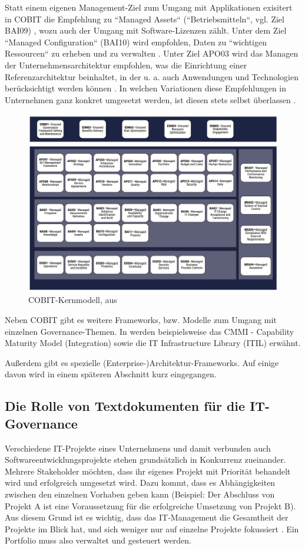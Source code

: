 Statt einem eigenen Management-Ziel zum Umgang mit Applikationen exisitert in COBIT die Empfehlung zu ``Managed Assets`` (``Betriebsmitteln``, vgl. Ziel BAI09) \cite[S. 209-214]{isaca1}, wozu auch der Umgang mit Software-Lizenzen zählt. Unter dem Ziel ``Managed Configuration`` (BAI10) wird empfohlen, Daten zu ``wichtigen Ressourcen`` zu erheben und zu verwalten \cite[S. 73]{gaulke}. Unter Ziel APO03 wird das Managen der Unternehmensarchitektur empfohlen, was die Einrichtung einer Referenzarchitektur beinhaltet, in der u. a. auch Anwendungen und Technologien berücksichtigt werden können \cite[S. 70]{gaulke}. In welchen Variationen diese Empfehlungen in Unternehmen ganz konkret umgesetzt werden, ist diesen stets selbst überlassen \cite[S. 65]{gaulke}.
 
\begin{figure}[h]
\centering
\includegraphics[scale=0.9]{content/pics/Picture_7.png}
\caption{COBIT-Kernmodell, aus \cite[S. 21]{isaca2}}
\label{Abbildung:isaca}
\end{figure}

Neben COBIT gibt es weitere Frameworks, bzw. Modelle zum Umgang mit einzelnen Governance-Themen. In \cite[S. 127-133]{gaulke} werden beispielsweise das CMMI - Capability Maturity Model (Integration) sowie die IT Infrastructure Library (ITIL) erwähnt. 
 
Außerdem gibt es spezielle (Enterprise-)Architektur-Frameworks. Auf einige davon wird in einem späteren Abschnitt kurz eingegangen. 

\subsection{Die Rolle von Textdokumenten für die IT-Governance}
Verschiedene IT-Projekte eines Unternehmens und damit verbunden auch Softwareentwicklungsprojekte stehen grundsätzlich in Konkurrenz zueinander. Mehrere Stakeholder möchten, dass ihr eigenes Projekt mit Priorität behandelt wird und erfolgreich umgesetzt wird. Dazu kommt, dass es Abhängigkeiten zwischen den einzelnen Vorhaben geben kann (Beispiel: Der Abschluss von Projekt A ist eine Voraussetzung für die erfolgreiche Umsetzung von Projekt B). Aus diesem Grund ist es wichtig, dass das IT-Management die Gesamtheit der Projekte im Blick hat, und sich weniger nur auf einzelne Projekte fokussiert \cite[S. 1]{frey}. Ein Portfolio muss also verwaltet und gesteuert werden.

